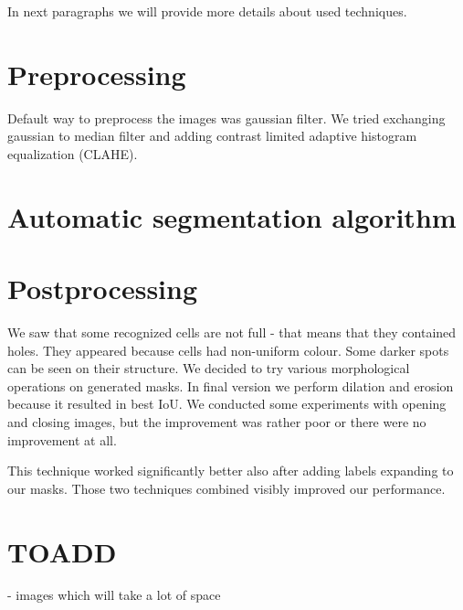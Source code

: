 \documentclass{article}
\begin{document}
In next paragraphs we will provide more details about used techniques.

\section{Preprocessing}

Default way to preprocess the images was gaussian filter. We tried exchanging gaussian to median filter and adding contrast limited adaptive histogram equalization (CLAHE).

\section{Automatic segmentation algorithm}

\section{Postprocessing}
We saw that some recognized cells are not full - that means that they contained holes. They appeared because cells had non-uniform colour. Some darker spots can be seen on their structure. We decided to try various morphological operations on generated masks. In final version we perform dilation and erosion because it resulted in best IoU. We conducted some experiments with opening and closing images, but the improvement was rather poor or there were no improvement at all.

This technique worked significantly better also after adding labels expanding to our masks. Those two techniques combined visibly improved our performance.

\section{TOADD}
- images which will take a lot of space
\end{document}
